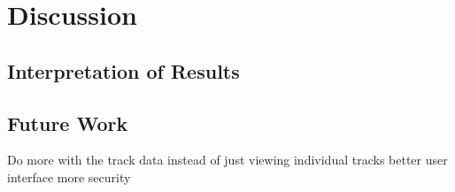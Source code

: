 \chapter{Discussion}
\label{discussion}
%

\section{Interpretation of Results}
%

\section{Future Work}
%

Do more with the track data instead of just viewing individual tracks
better user interface
more security